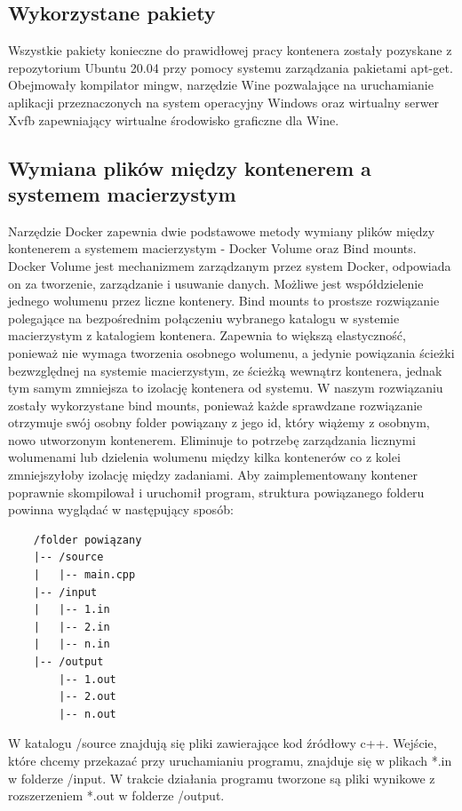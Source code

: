\subsection{Wykorzystane pakiety}
Wszystkie pakiety konieczne do prawidłowej pracy kontenera zostały pozyskane z repozytorium Ubuntu 20.04 przy pomocy systemu zarządzania pakietami apt-get. Obejmowały kompilator mingw, narzędzie Wine pozwalające na uruchamianie aplikacji przeznaczonych na system operacyjny Windows oraz wirtualny serwer Xvfb zapewniający wirtualne środowisko graficzne dla Wine.

\subsection{Wymiana plików między kontenerem a systemem macierzystym}
Narzędzie Docker zapewnia dwie podstawowe metody wymiany plików między kontenerem a systemem macierzystym - Docker Volume\cite{dockerVolume} oraz Bind mounts\cite{dockerBindMounts}. Docker Volume jest mechanizmem zarządzanym przez system Docker, odpowiada on za tworzenie, zarządzanie i usuwanie danych. Możliwe jest współdzielenie jednego wolumenu przez liczne kontenery. Bind mounts to prostsze rozwiązanie polegające na bezpośrednim połączeniu wybranego katalogu w systemie macierzystym z katalogiem kontenera. Zapewnia to większą elastyczność, ponieważ nie wymaga tworzenia osobnego wolumenu, a jedynie powiązania ścieżki bezwzględnej na systemie macierzystym, ze ścieżką wewnątrz kontenera, jednak tym samym zmniejsza to izolację kontenera od systemu. W naszym rozwiązaniu zostały wykorzystane bind mounts, ponieważ każde sprawdzane rozwiązanie otrzymuje swój osobny folder powiązany z jego id, który wiążemy z osobnym, nowo utworzonym kontenerem. Eliminuje to potrzebę zarządzania licznymi wolumenami lub dzielenia wolumenu między kilka kontenerów co z kolei zmniejszyłoby izolację między zadaniami. Aby zaimplementowany kontener poprawnie skompilował i uruchomił program, struktura powiązanego folderu powinna wyglądać w następujący sposób:
\begin{verbatim}
    /folder powiązany
    |-- /source
    |   |-- main.cpp
    |-- /input
    |   |-- 1.in
    |   |-- 2.in
    |   |-- n.in
    |-- /output
        |-- 1.out
        |-- 2.out
        |-- n.out
\end{verbatim}
W katalogu /source znajdują się pliki zawierające kod źródłowy c++. Wejście, które chcemy przekazać przy uruchamianiu programu, znajduje się w plikach *.in w folderze /input. W trakcie działania programu tworzone są pliki wynikowe z rozszerzeniem *.out w folderze /output. 

